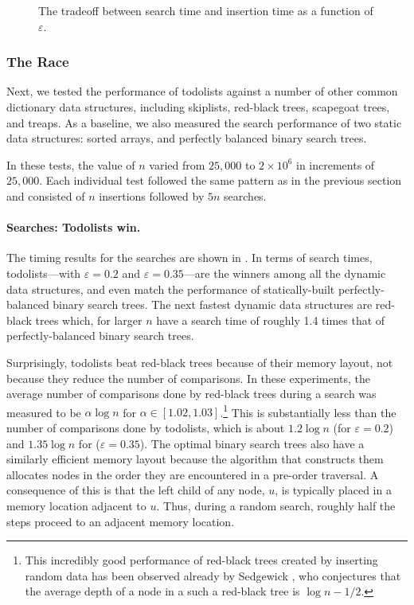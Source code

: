 \documentclass{patmorin}
\newcommand{\eps}{\varepsilon}
\begin{document}
\begin{figure}
  \centering{}
  \caption{The tradeoff between search time and insertion time as a function of $\eps$.}
\end{figure}

\subsubsection{The Race}

Next, we tested the performance of todolists against a number of other
common dictionary data structures, including skiplists, red-black trees,
scapegoat trees, and treaps. As a baseline, we also measured the search
performance of two static data structures: sorted arrays, and perfectly
balanced binary search trees.

In these tests, the value of $n$ varied from $25,000$ to $2\times 10^6$
in increments of $25,000$.   Each individual test followed the same
pattern as in the previous section and consisted of $n$ insertions
followed by $5n$ searches.

\paragraph{Searches: Todolists win.}
The timing results for the searches are shown in . In
terms of search times, todolists---with $\eps = 0.2$ and $\eps=0.35$---are
the winners among all the dynamic data structures, and even match the
performance of statically-built perfectly-balanced binary search trees.
The next fastest dynamic data structures are red-black trees which,
for larger $n$ have a search time of roughly 1.4 times that of
perfectly-balanced binary search trees.

Surprisingly, todolists beat red-black trees because of their memory
layout, not because they reduce the number of comparisons. In
these experiments, the average number of comparisons done by
red-black trees during a search was measured to be $\alpha\log n$
for $\alpha\in[1.02,1.03]$.\footnote{This incredibly good performance
of red-black trees created by inserting random data has been observed
already by Sedgewick \cite{sedgewick:left-leaning}, who conjectures
that the average depth of a node in a such a red-black tree is $\log
n-1/2$.} This is substantially less than the number of comparisons done
by todolists, which is about $1.2\log n$ (for $\eps=0.2$) and $1.35\log
n$ for ($\eps=0.35$). The optimal binary search trees also have a
similarly efficient memory layout because the algorithm that constructs
them allocates nodes in the order they are encountered in a pre-order
traversal. A consequence of this is that the left child of any node,
$u$, is typically placed in a memory location adjacent to $u$.  Thus,
during a random search, roughly half the steps proceed to an adjacent
memory location.
\end{document}
